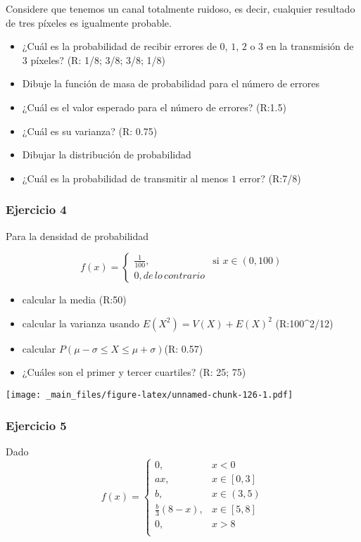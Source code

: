 \documentclass[
]{book}
\providecommand{\tightlist}{%
  \setlength{\itemsep}{0pt}\setlength{\parskip}{0pt}}
\begin{document}
Considere que tenemos un canal totalmente ruidoso, es decir, cualquier resultado de tres píxeles es igualmente probable.

\begin{itemize}
\item
  ¿Cuál es la probabilidad de recibir errores de \(0\), \(1\), \(2\) o \(3\) en la transmisión de \(3\) píxeles? (R: 1/8; 3/8; 3/8; 1/8)
\item
  Dibuje la función de masa de probabilidad para el número de errores
\item
  ¿Cuál es el valor esperado para el número de errores? (R:1.5)
\item
  ¿Cuál es su varianza? (R: 0.75)
\item
  Dibujar la distribución de probabilidad
\item
  ¿Cuál es la probabilidad de transmitir al menos \(1\) error?
  (R:7/8)
\end{itemize}

\hypertarget{ejercicio-4-1}{%
\subsubsection{Ejercicio 4}\label{ejercicio-4-1}}

Para la densidad de probabilidad

\[
    f(x)=
\begin{cases}
    \frac{1}{100},& \text{si } x\in (0,100)\\
    0, de\, lo\, contrario
\end{cases}
\]

\begin{itemize}
\tightlist
\item
  calcular la media (R:50)
\item
  calcular la varianza usando \(E(X^2)=V(X)+E(X)^2\) (R:100\^{}2/12)
\item
  calcular \(P(\mu-\sigma\leq X \leq \mu+\sigma)\)(R: 0.57)
\item
  ¿Cuáles son el primer y tercer cuartiles? (R: 25; 75)
\end{itemize}

\texttt{[image: \_main\_files/figure-latex/unnamed-chunk-126-1.pdf]}

\hypertarget{ejercicio-5-1}{%
\subsubsection{Ejercicio 5}\label{ejercicio-5-1}}

Dado
\[
    f(x)= 
\begin{cases}
0, & x < 0 \\
ax, & x \in [0,3] \\
b, & x \in (3,5) \\
\frac{b}{3}(8-x),& x \in [5,8]\\
0, & x > 8 \\
\end{cases}
\]
\end{document}
